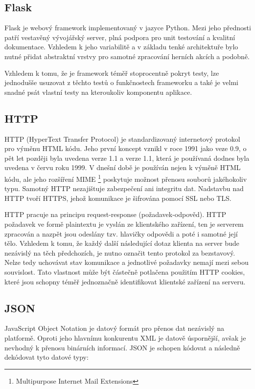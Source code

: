 \documentclass[16pt,titlepage,a4paper]{article}
\begin{document}
\subsection{Flask}

Flask je webový framework implementovaný v jazyce Python. Mezi jeho přednosti patří vestavěný vývojářský server, plná podpora pro unit testování a kvalitní dokumentace. Vzhledem k jeho variabilitě a v základu tenké architektuře bylo nutné přidat abstraktní vrstvy pro samotné zpracování herních akcích a podobně.

Vzhledem k tomu, že je framework téměř stoprocentně pokryt testy, lze jednodušše usuzovat z těchto testů o funkčnostech frameworku a také je velmi snadné psát vlastní testy na kteroukoliv komponentu aplikace.
\subsection{HTTP}

HTTP (HyperText Transfer Protocol) je standardizovaný internetový protokol pro výměnu HTML kódu. Jeho první koncept vznikl v roce 1991 jako veze 0.9, o pět let později byla uvedena verze 1.1 a verze 1.1, která je používaná dodnes byla uvedena v červu roku 1999. V dnešní době je používán nejen k výměně HTML kódu, ale jeho rozšíření MIME \footnote{Multipurpose Internet Mail Extensions} poskytuje možnost přenosu souborů jakéhokoliv typu. Samotný HTTP nezajištuje zabezpečení ani integritu dat. Nadstavbu nad HTTP tvoří HTTPS, jehož komunikace je šifrována pomocí SSL nebo TLS.

HTTP pracuje na principu request-response (požadavek-odpověd). HTTP požadavek ve formě plaintextu je vyslán ze klientského zařízení, ten je serverem zpracován a nazpět jsou odeslány tzv. hlavičky odpovědi a poté i samotné její tělo. Vzhledem k tomu, že každý další následující dotaz klienta na server bude nezávislý na těch předchozích, je nutno označit tento protokol za bezstavový. Nelze tedy uchovávat stav komunikace a jednotlivé požadavky nemají mezi sebou souvislost. Tato vlastnost může být částečně potlačena použitím HTTP cookies, které jsou schopny téměř jednoznačně identifikovat klientské zařízení na serveru.

\subsection{JSON}

JavaScript Object Notation je datový formát pro přenos dat nezávislý na platformě. Oproti jeho hlavnímu konkurentu XML je datově úspornější, avšak je nevhodný k přenosu binárních informací. JSON je schopen kódovat a následně dekódovat tyto datové typy:
\end{document}
